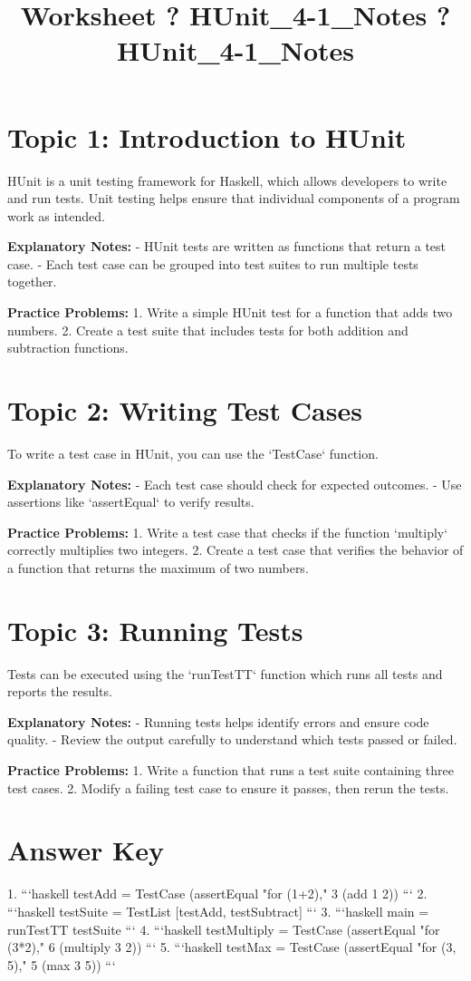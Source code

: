 \documentclass{article}
\title{Worksheet ? HUnit\_4-1\_Notes ? HUnit\_4-1\_Notes}
\author{}
\date{}
\begin{document}
\maketitle

\section*{Topic 1: Introduction to HUnit}
HUnit is a unit testing framework for Haskell, which allows developers to write and run tests. Unit testing helps ensure that individual components of a program work as intended.

\textbf{Explanatory Notes:}
- HUnit tests are written as functions that return a test case.
- Each test case can be grouped into test suites to run multiple tests together.

\textbf{Practice Problems:}
1. Write a simple HUnit test for a function that adds two numbers.
2. Create a test suite that includes tests for both addition and subtraction functions.

\section*{Topic 2: Writing Test Cases}
To write a test case in HUnit, you can use the `TestCase` function.

\textbf{Explanatory Notes:}
- Each test case should check for expected outcomes.
- Use assertions like `assertEqual` to verify results.

\textbf{Practice Problems:}
1. Write a test case that checks if the function `multiply` correctly multiplies two integers.
2. Create a test case that verifies the behavior of a function that returns the maximum of two numbers.

\section*{Topic 3: Running Tests}
Tests can be executed using the `runTestTT` function which runs all tests and reports the results.

\textbf{Explanatory Notes:}
- Running tests helps identify errors and ensure code quality.
- Review the output carefully to understand which tests passed or failed.

\textbf{Practice Problems:}
1. Write a function that runs a test suite containing three test cases.
2. Modify a failing test case to ensure it passes, then rerun the tests.

\section*{Answer Key}
1. 
```haskell
testAdd = TestCase (assertEqual "for (1+2)," 3 (add 1 2))
```
2. 
```haskell
testSuite = TestList [testAdd, testSubtract]
```
3. 
```haskell
main = runTestTT testSuite
```
4. 
```haskell
testMultiply = TestCase (assertEqual "for (3*2)," 6 (multiply 3 2))
```
5. 
```haskell
testMax = TestCase (assertEqual "for (3, 5)," 5 (max 3 5))
```
\end{document}
